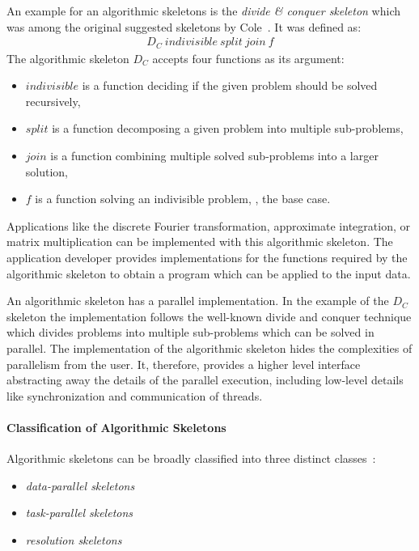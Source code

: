 An example for an algorithmic skeletons is the \emph{divide \& conquer skeleton} which was among the original suggested skeletons by Cole~\cite{Cole1991}.
It was defined as:
\begin{align*}
  D_C\ indivisible\ split\ join\ f%
\end{align*}
The algorithmic skeleton $D_C$ accepts four functions as its argument:
\begin{itemize}
  \item $indivisible$ is a function deciding if the given problem should be solved recursively,
  \item $split$ is a function decomposing a given problem into multiple sub-problems,
  \item $join$ is a function combining multiple solved sub-problems into a larger solution,
  \item $f$ is a function solving an indivisible problem, \ie, the base case.
\end{itemize}

Applications like the discrete Fourier transformation, approximate integration, or matrix multiplication can be implemented with this algorithmic skeleton.
The application developer provides implementations for the functions required by the algorithmic skeleton to obtain a program which can be applied to the input data.

An algorithmic skeleton has a parallel implementation.
In the example of the $D_C$ skeleton the implementation follows the well-known divide and conquer technique which divides problems into multiple sub-problems which can be solved in parallel.
The implementation of the algorithmic skeleton hides the complexities of parallelism from the user.
It, therefore, provides a higher level interface abstracting away the details of the parallel execution, including low-level details like synchronization and communication of threads.

\paragraph{Classification of Algorithmic Skeletons}
Algorithmic skeletons can be broadly classified into three distinct classes~\cite{}:
\begin{itemize}
  \item \emph{data-parallel skeletons}
  \item \emph{task-parallel skeletons}
  \item \emph{resolution skeletons}
\end{itemize}


